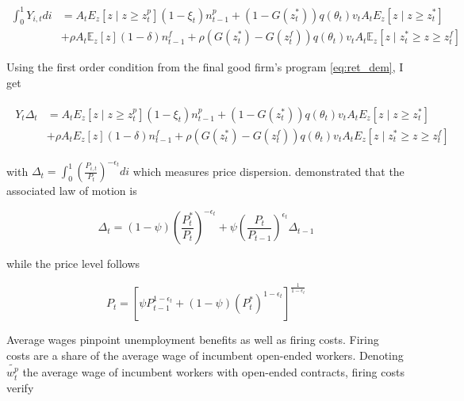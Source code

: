 \begin{align*}
\int_{0}^{1} Y_{i,t} di &= A_t E_z \left[z \mid z \geq z_t^p \right] \left( 1 - \xi_t \right) n_{t-1}^p + \left( 1 - G\left( z_t^* \right)\right) q \left( \theta_t \right) v_t A_t E_z \left[z \mid z \geq z_t^* \right]\\
&+ \rho A_t \mathbb{E}_z \left[ z \right] \left( 1 - \delta \right) n_{t-1}^f + \rho \left( G\left( z_t^* \right) - G\left( z_t^f \right)\right) q \left( \theta_t \right) v_t A_t \mathbb{E}_z \left[z \mid z_t^* \geq z \geq z_t^f \right]
\end{align*}

Using the first order condition from the final good firm's program \eqref{eq:ret_dem}, I get

\begin{align}
\begin{split}
Y_t \Delta_t &= A_t E_z \left[z \mid z \geq z_t^p \right] \left( 1 - \xi_t \right) n_{t-1}^p + \left( 1 - G\left( z_t^* \right)\right) q \left( \theta_t \right) v_t A_t E_z \left[z \mid z \geq z_t^* \right]\\
&+ \rho A_t E_z \left[ z \right] \left( 1 - \delta \right) n_{t-1}^f + \rho \left( G\left( z_t^* \right) - G\left( z_t^f \right)\right) q \left( \theta_t \right) v_t A_t E_z \left[z \mid z_t^* \geq z \geq z_t^f \right] \label{eq:res_cons_int}
\end{split}
\end{align}

with $\Delta_t = \int_{0}^{1} \left( \frac{P_{i,t}}{P_t}\right)^{-\epsilon_t} di$ which measures price dispersion. \citet{yun1996nominal} demonstrated that the associated law of motion is

\begin{equation}
\Delta_t = (1-\psi) \left( \frac{P_t^*}{P_t} \right)^{-\epsilon_t} + \psi \left( \frac{P_t}{P_{t-1}} \right)^{\epsilon_t} \Delta_{t-1}
\end{equation}

while the price level follows

\begin{equation}
P_t = \left[ \psi P_{t-1}^{1-\epsilon_t} + (1-\psi) \left( P_t^* \right)^{1-\epsilon_t} \right]^{\frac{1}{1-\epsilon_t}} \label{eq:lm_price}
\end{equation}

Average wages pinpoint unemployment benefits as well as firing costs. Firing costs are a share of the average wage of incumbent open-ended workers. Denoting $\widetilde{w_t^p}$ the average wage of incumbent workers with open-ended contracts, firing costs verify

